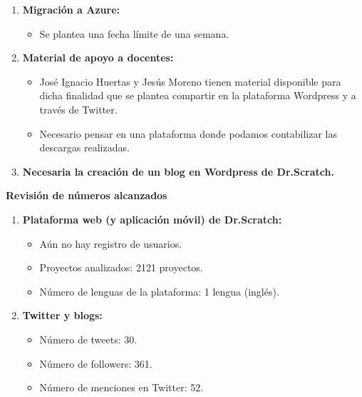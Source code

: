 \documentclass[a4paper,12pt]{letter}
\begin{document}
\begin{letter}
\begin{enumerate}
    
	\item{\textbf {Migración a Azure:}}
    \begin{itemize}
        \item {Se plantea una fecha límite de una semana.}
    \end{itemize}
    \vspace{0.5cm}
	\item {\textbf {Material de apoyo a docentes:}}
    \begin{itemize}
        \item {José Ignacio Huertas y Jesús Moreno tienen material disponible 
              para dicha finalidad que se plantea compartir en la plataforma 
              Wordpress y a través de Twitter.}
        \item {Necesario pensar en una plataforma donde podamos contabilizar
               las descargas realizadas.}
    \end{itemize}

    \item {\textbf {Necesaria la creación de un blog en Wordpress de Dr.Scratch.}}

\end{enumerate}

\vspace{1cm} 
\textbf{\LARGE Revisión de números alcanzados}

\setlength{\parskip}{4mm}
\begin{enumerate}
    \item {\textbf{Plataforma web (y aplicación móvil) de Dr.Scratch:}}
	
    \setlength{\parskip}{2mm}
    \begin{itemize}
      	\setlength{\parskip}{0mm}        
       	\item {Aún no hay registro de usuarios.}      
	    \item {Proyectos analizados: 2121 proyectos.}
	    \item {Número de lenguas de la plataforma: 1 lengua (inglés).}
    \end{itemize}

    \item {\textbf{Twitter y blogs:}}

    \setlength{\parskip}{2mm}
    \begin{itemize}
      	\setlength{\parskip}{0mm}        
       	\item {Número de tweets: 30.}  
	    \item {Número de followers: 361.}
	    \item {Número de menciones en Twitter: 52.}
    \end{itemize}

\end{enumerate}
\end{letter}
\end{document}
